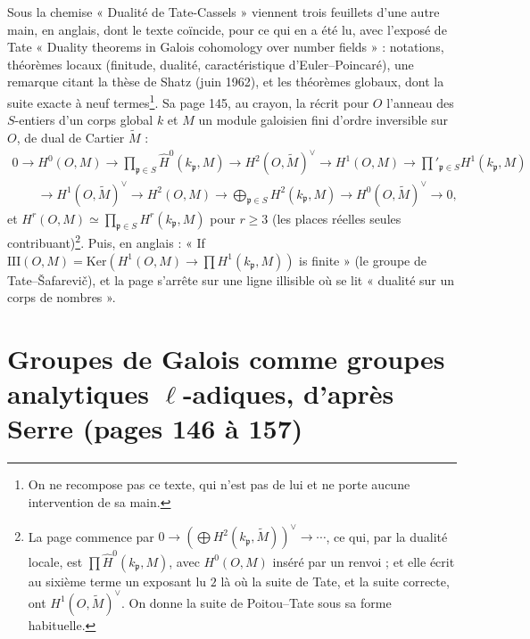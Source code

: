 \documentclass[11pt,a4paper]{article}
\begin{document}
Sous la chemise « Dualité de Tate-Cassels » viennent trois feuillets d'une autre
main, en anglais, dont le texte coïncide, pour ce qui en a été lu, avec l'exposé
de Tate « Duality theorems in Galois cohomology over number fields » : notations,
théorèmes locaux (finitude, dualité, caractéristique d'Euler--Poincaré), une
remarque citant la thèse de Shatz (juin 1962), et les théorèmes globaux, dont la
suite exacte à neuf termes\footnote{On ne recompose pas ce texte, qui n'est pas de
lui et ne porte aucune intervention de sa main.}. Sa page 145, au crayon, la
récrit pour $O$ l'anneau des $S$-entiers d'un corps global $k$ et $M$ un module
galoisien fini d'ordre inversible sur $O$, de dual de Cartier $\tilde M$ :
\[
\begin{array}{l}
0 \to H^0(O, M) \to \prod_{\mathfrak{p} \in S} \hat H^0(k_{\mathfrak{p}}, M) \to
H^2(O, \tilde M)^{\vee} \to H^1(O, M) \to \prod'_{\mathfrak{p} \in S} H^1(k_{\mathfrak{p}}, M) \\
\qquad \to H^1(O, \tilde M)^{\vee} \to H^2(O, M) \to \bigoplus_{\mathfrak{p} \in S}
H^2(k_{\mathfrak{p}}, M) \to H^0(O, \tilde M)^{\vee} \to 0,
\end{array}
\]
et $H^r(O, M) \simeq \prod_{\mathfrak{p} \in S} H^r(k_{\mathfrak{p}}, M)$ pour $r \geq 3$
(les places réelles seules contribuant)\footnote{La page commence par
$0 \to (\bigoplus H^2(k_{\mathfrak{p}}, \tilde M))^{\vee} \to \cdots$, ce qui, par la
dualité locale, est $\prod \hat H^0(k_{\mathfrak{p}}, M)$, avec $H^0(O, M)$ inséré
par un renvoi ; et elle écrit au sixième terme un exposant lu $2$ là où la suite
de Tate, et la suite correcte, ont $H^1(O, \tilde M)^{\vee}$. On donne la suite de
Poitou--Tate sous sa forme habituelle.}. Puis, en anglais : « If
$\mathrm{III}(O, M) = \mathrm{Ker}(H^1(O, M) \to \prod H^1(k_{\mathfrak{p}}, M))$ is
finite » (le groupe de Tate–Šafarevič), et la page s'arrête sur une ligne
illisible où se lit « dualité sur un corps de nombres ».

\section*{Groupes de Galois comme groupes analytiques $\ell$-adiques, d'après Serre (pages 146 à 157)}
\end{document}
